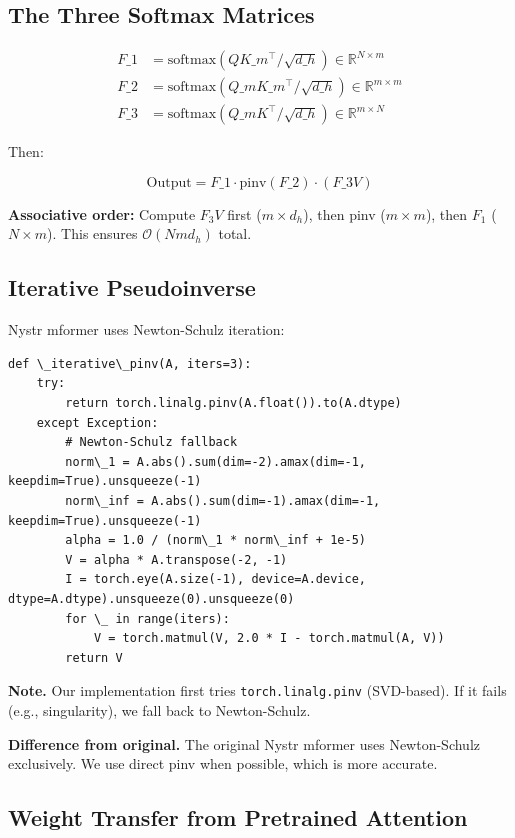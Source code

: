 \subsection{The Three Softmax Matrices}

\[
\begin{aligned}
F\_1 &= \text{softmax}(Q K\_m^\top / \sqrt{d\_h}) \in \mathbb{R}^{N \times m} \\
F\_2 &= \text{softmax}(Q\_m K\_m^\top / \sqrt{d\_h}) \in \mathbb{R}^{m \times m} \\
F\_3 &= \text{softmax}(Q\_m K^\top / \sqrt{d\_h}) \in \mathbb{R}^{m \times N}
\end{aligned}
\tag{4.2}
\]

Then:

\[
\text{Output} = F\_1 \cdot \text{pinv}(F\_2) \cdot (F\_3 V)
\tag{4.3}
\]

\textbf{Associative order:} Compute $F_3 V$ first ($m \times d_h$), then pinv 
($m \times m$), then $F_1$ ($N \times m$). This ensures $\mathcal{O}(N m d_h)$ 
total.

\subsection{Iterative Pseudoinverse}

Nystr mformer uses Newton-Schulz iteration:

\begin{lstlisting}
def \_iterative\_pinv(A, iters=3):
    try:
        return torch.linalg.pinv(A.float()).to(A.dtype)
    except Exception:
        # Newton-Schulz fallback
        norm\_1 = A.abs().sum(dim=-2).amax(dim=-1, keepdim=True).unsqueeze(-1)
        norm\_inf = A.abs().sum(dim=-1).amax(dim=-1, keepdim=True).unsqueeze(-1)
        alpha = 1.0 / (norm\_1 * norm\_inf + 1e-5)
        V = alpha * A.transpose(-2, -1)
        I = torch.eye(A.size(-1), device=A.device, dtype=A.dtype).unsqueeze(0).unsqueeze(0)
        for \_ in range(iters):
            V = torch.matmul(V, 2.0 * I - torch.matmul(A, V))
        return V
\end{lstlisting}

\textbf{Note.} Our implementation first tries \texttt{torch.linalg.pinv} (SVD-based). 
If it fails (e.g., singularity), we fall back to Newton-Schulz.

\textbf{Difference from original.} The original Nystr mformer uses Newton-Schulz 
exclusively. We use direct pinv when possible, which is more accurate.

\subsection{Weight Transfer from Pretrained Attention}


